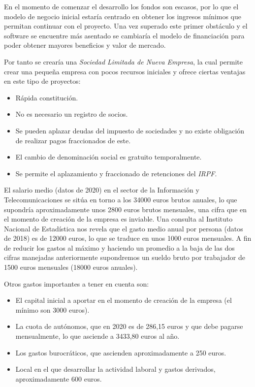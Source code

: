 En el momento de comenzar el desarrollo los fondos son escasos, por lo que el modelo de negocio inicial estaría centrado en obtener los ingresos mínimos que permitan continuar con el proyecto. Una vez superado este primer obstáculo y el software se encuentre más asentado se cambiaría el modelo de financiación para poder obtener mayores beneficios y valor de mercado.

Por tanto se crearía una \textit{Sociedad Limitada de Nueva Empresa}, la cual permite crear una pequeña empresa con pocos recursos iniciales y ofrece ciertas ventajas en este tipo de proyectos:

\begin{itemize}
	\item Rápida constitución.
	\item No es necesario un registro de socios.
	\item Se pueden aplazar deudas del impuesto de sociedades y no existe obligación de realizar pagos fraccionados de este.
	\item El cambio de denominación social es gratuito temporalmente.
	\item Se permite el aplazamiento y fraccionado de retenciones del \textit{IRPF}.
\end{itemize}

El salario medio (datos de 2020) en el sector de la Información y Telecomunicaciones se sitúa en torno a los 34000 euros brutos anuales, lo que supondría aproximadamente unos 2800 euros brutos mensuales, una cifra que en el momento de creación de la empresa es inviable. Una consulta al Instituto Nacional de Estadística nos revela que el gasto medio anual por persona (datos de 2018) es de 12000 euros, lo que se traduce en unos 1000 euros mensuales. A fin de reducir los gastos al máximo y haciendo un promedio a la baja de las dos cifras manejadas anteriormente supondremos un sueldo bruto por trabajador de 1500 euros mensuales (18000 euros anuales).

\bigskip
Otros gastos importantes a tener en cuenta son:
\begin{itemize}
	\item El capital inicial a aportar en el momento de creación de la empresa (el mínimo son 3000 euros).
	\item La cuota de autónomos, que en 2020 es de 286,15 euros y que debe pagarse mensualmente, lo que asciende a 3433,80 euros al año.
	\item Los gastos burocráticos, que ascienden aproximadamente a 250 euros.
	\item Local en el que desarrollar la actividad laboral y gastos derivados, aproximadamente 600 euros. 
\end{itemize}

